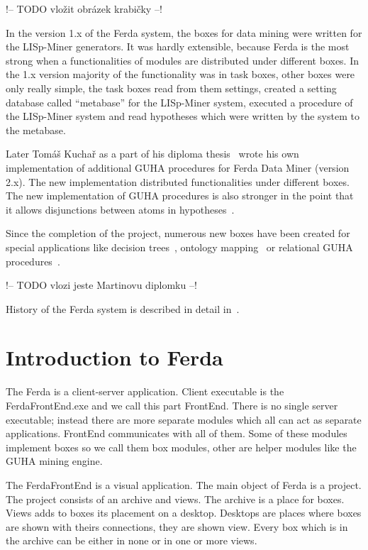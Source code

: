 \documentclass[a4paper,12pt]{book}
\begin{document}
!-- TODO vložit obrázek krabičky --!

In the version 1.x of the Ferda system, the boxes for data mining were written for the LISp-Miner generators. It was hardly extensible, because Ferda is the most strong when a functionalities of modules are distributed under different boxes. In the 1.x version majority of the functionality was in task boxes, other boxes were only really simple, the task boxes read from them settings, created a setting database called ``metabase'' for the LISp-Miner system, executed a procedure of the LISp-Miner system and read hypotheses which were written by the system to the metabase.

Later Tomáš Kuchař as a part of his diploma thesis~\cite{thesisKuchar} wrote his own implementation of additional GUHA procedures for Ferda Data Miner (version 2.x). The new implementation distributed functionalities under different boxes. The new implementation of GUHA procedures is also stronger in the point that it allows disjunctions between atoms in hypotheses~\cite{RalbovskyDisjunction}.

Since the completion of the project, numerous new boxes have been created for special applications like decision trees~\cite{GUHAtrees}, ontology mapping~\cite{thesisZeman} or relational GUHA procedures~\cite{thesisKuzmin}. 

!-- TODO vlozi jeste Martinovu diplomku --!

History of the Ferda system is described in detail in~\cite{RalbovskyHistory}.

\section{Introduction to Ferda}
The Ferda is a client-server application. Client executable is the FerdaFrontEnd.exe and we call this part FrontEnd. There is no single server executable; instead there are more separate modules which all can act as separate applications. FrontEnd communicates with all of them. Some of these modules implement boxes so we call them box modules, other are helper modules like the GUHA mining engine.

The FerdaFrontEnd is a visual application. The main object of Ferda is a project. The project consists of an archive and views. The archive is a place for boxes. Views adds to boxes its placement on a desktop. Desktops are places where boxes are shown with theirs connections, they are shown view. Every box which is in the archive can be either in none or in one or more views.
\end{document}
